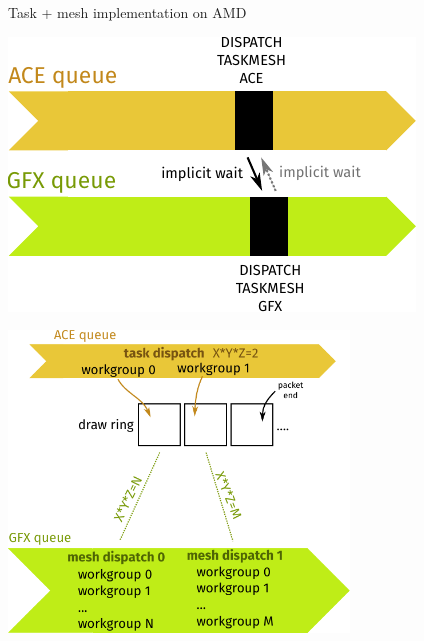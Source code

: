 \documentclass[aspectratio=169,t,xcolor=table]{beamer}
\begin{document}
\begin{frame}{Task + mesh implementation on AMD}

    \LARGE

    \begin{center}
        \includegraphics{figs/task_queues.svg.pdf}
    \end{center}

\end{frame}

\begin{frame}{}

    \LARGE

    \begin{center}
        \includegraphics[height=8cm]{figs/task_queues_draw_ring.svg.pdf}
    \end{center}

\end{frame}
\end{document}
